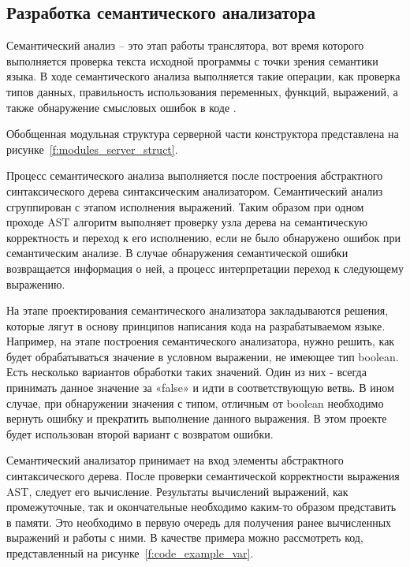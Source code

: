 \subsection{Разработка семантического анализатора}


Семантический анализ – это этап работы транслятора, вот время которого выполняется проверка текста исходной программы с точки зрения семантики языка.
В ходе семантического анализа выполняется такие операции, как проверка типов данных, правильность использования переменных, функций, выражений, а также обнаружение смысловых ошибок в коде .

Обобщенная модульная структура серверной части конструктора представлена на рисунке~\ref{f:modules_server_struct}.

Процесс семантического анализа выполняется после построения абстрактного синтаксического дерева синтаксическим анализатором.
Семантический анализ сгруппирован с этапом исполнения выражений.
Таким образом при одном проходе AST алгоритм выполняет проверку узла дерева на семантическую корректность и переход к его исполнению,
если не было обнаружено ошибок при семантическим анализе. В случае обнаружения семантической ошибки возвращается информация о ней,
а процесс интерпретации переход к следующему выражению.

На этапе проектирования семантического анализатора закладываются решения, которые лягут в основу принципов написания кода на разрабатываемом языке.
Например, на этапе построения семантического анализатора, нужно решить, как будет обрабатываться значение в условном выражении, не имеющее тип boolean.
Есть несколько вариантов обработки таких значений.
Один из них - всегда принимать данное значение за «false» и идти в соответствующую ветвь.
В ином случае, при обнаружении значения с типом, отличным от boolean необходимо вернуть ошибку и прекратить выполнение данного выражения.
В этом проекте будет использован второй вариант с возвратом ошибки.

Семантический анализатор принимает на вход элементы абстрактного синтаксического дерева.
После проверки семантической корректности выражения AST, следует его вычисление.
Результаты вычислений выражений, как промежуточные, так и окончательные необходимо каким-то образом представить в памяти.
Это необходимо в первую очередь для получения ранее вычисленных выражений и работы с ними.
В качестве примера можно рассмотреть код, представленный на рисунке~\ref{f:code_example_var}.

